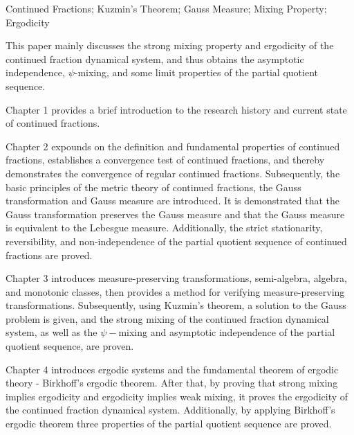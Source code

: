 \begin{enabstract}{Continued Fractions; Kuzmin's Theorem; Gauss Measure; Mixing Property; Ergodicity}

This paper mainly discusses the strong mixing property and ergodicity of the continued fraction dynamical system, and thus obtains the asymptotic independence, $\psi$-mixing, and some limit properties of the partial quotient sequence.

Chapter 1 provides a brief introduction to the research history and current state of continued fractions.

Chapter 2 expounds on the definition and fundamental properties of continued fractions, establishes a convergence test of continued fractions, and thereby demonstrates the convergence of regular continued fractions. Subsequently, the basic principles of the metric theory of continued fractions, the Gauss transformation and Gauss measure are introduced. It is demonstrated that the Gauss transformation preserves the Gauss measure and that the Gauss measure is equivalent to the Lebesgue measure. Additionally, the strict stationarity, reversibility, and non-independence of the partial quotient sequence of continued fractions are proved.

Chapter 3 introduces measure-preserving transformations, semi-algebra, algebra, and monotonic classes, then provides a method for verifying measure-preserving transformations. Subsequently, using Kuzmin's theorem, a solution to the Gauss problem is given, and the strong mixing of the continued fraction dynamical system, as well as the $\psi-$mixing and asymptotic independence of the partial quotient sequence, are proven.

Chapter 4 introduces ergodic systems and the fundamental theorem of ergodic theory - Birkhoff's ergodic theorem. After that, by proving that strong mixing implies ergodicity and ergodicity implies weak mixing, it proves the ergodicity of the continued fraction dynamical system. Additionally, by applying Birkhoff's ergodic theorem three properties of the partial quotient sequence are proved.

\end{enabstract}
